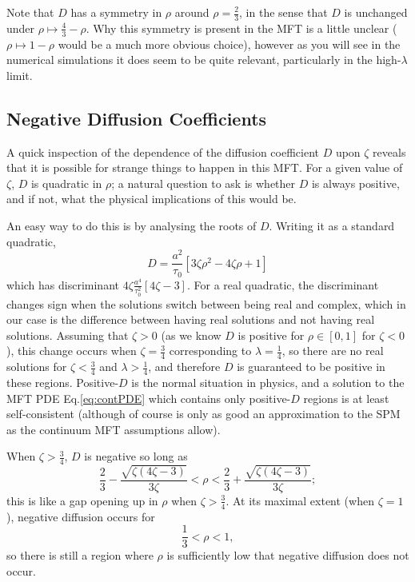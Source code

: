 Note that $D$ has a symmetry in $\rho$ around $\rho = \frac{2}{3}$, in the sense that $D$ is unchanged under $\rho \mapsto \frac{4}{3} - \rho$. Why this symmetry is present in the MFT is a little unclear ($\rho \mapsto 1 - \rho$
would be a much more obvious choice), however as you will see in the numerical simulations it does seem to be quite relevant, particularly in the high-$\lambda$ limit.

\subsection{Negative Diffusion Coefficients}
\label{sec:negDiffCoeff}
A quick inspection of the dependence of the diffusion coefficient $D$ upon $\zeta$ reveals that it is possible for strange things to happen in this MFT. For a given value of $\zeta$, $D$ is quadratic in $\rho$; a natural question
to ask is whether $D$ is always positive, and if not, what the physical implications of this would be. 

An easy way to do this is by analysing the roots of $D$. Writing it as a standard quadratic,
\begin{equation}
 D = \frac{a^2}{\tau_0} \left[  3 \zeta \rho^2 - 4 \zeta \rho + 1  \right]
\end{equation}
which has discriminant $4 \zeta \frac{a^4}{\tau_0^2}\left[4 \zeta - 3\right]$. For a real quadratic, the discriminant changes sign when the solutions switch between being real and complex, which in our case is the difference
between having real solutions and not having real solutions. Assuming that $\zeta > 0$ (as we know $D$ is positive for $\rho \in [0, 1]$ for $\zeta<0$),  this change occurs when $\zeta = \frac{3}{4}$ corresponding to $\lambda=\frac{1}{4}$, so there are no real solutions for $\zeta<\frac{3}{4}$ and $\lambda>\frac{1}{4}$,
and therefore $D$ is guaranteed to be positive in these regions. Positive-$D$ is the normal situation in physics, and a solution to the MFT PDE Eq.\ref{eq:contPDE} which contains only positive-$D$ regions is at  least
self-consistent (although of course is only as good an approximation to the SPM as the continuum MFT assumptions allow).

When $\zeta > \frac{3}{4}$, $D$ is negative so long as
\begin{equation}
 \frac{2}{3} - \frac{\sqrt{\zeta(4\zeta-3)}}{3\zeta} < \rho < \frac{2}{3} + \frac{\sqrt{\zeta(4\zeta-3)}}{3\zeta};
\end{equation}
this is like a gap opening up in $\rho$ when $\zeta > \frac{3}{4}$. At its maximal extent (when $\zeta=1$), negative diffusion occurs for
\begin{equation}
 \frac{1}{3} < \rho < 1,
\end{equation}
so there is still a region where $\rho$ is sufficiently low that negative diffusion does not occur.

